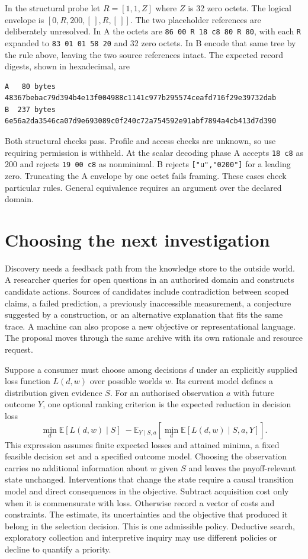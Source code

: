 \documentclass[11pt,a4paper]{article}
\newcommand{\partpage}[1]{\clearpage\section{#1}}
\newcommand{\topic}[1]{\par\smallskip{\sffamily\bfseries\color{ink}#1\par}\nobreak}
\begin{document}
\topic{Reference cases with known answers}
In the structural probe let $R=[1,1,Z]$ where $Z$ is 32 zero octets. The logical envelope is $[0,R,200,[\,],R,[\,]]$. The two placeholder references are deliberately unresolved. In A the octets are \texttt{86 00 R 18 c8 80 R 80}, with each \texttt{R} expanded to \texttt{83 01 01 58 20} and 32 zero octets. In B encode that same tree by the rule above, leaving the two source references intact. The expected record digests, shown in hexadecimal, are
\begin{small}
\begin{verbatim}
A   80 bytes   48367bebac79d394b4e13f004988c1141c977b295574ceafd716f29e39732dab
B  237 bytes   6e56a2da3546ca07d9e693089c0f240c72a754592e91abf7894a4cb413d7d390
\end{verbatim}
\end{small}
Both structural checks pass. Profile and access checks are unknown, so use requiring permission is withheld. At the scalar decoding phase A accepts \texttt{18 c8} as 200 and rejects \texttt{19 00 c8} as nonminimal. B rejects \texttt{["u","0200"]} for a leading zero. Truncating the A envelope by one octet fails framing. These cases check particular rules. General equivalence requires an argument over the declared domain.

\partpage{Choosing the next investigation}
Discovery needs a feedback path from the knowledge store to the outside world. A researcher queries for open questions in an authorised domain and constructs candidate actions. Sources of candidates include contradiction between scoped claims, a failed prediction, a previously inaccessible measurement, a conjecture suggested by a construction, or an alternative explanation that fits the same trace. A machine can also propose a new objective or representational language. The proposal moves through the same archive with its own rationale and resource request.

\topic{Planning under uncertainty}
Suppose a consumer must choose among decisions $d$ under an explicitly supplied loss function $L(d,w)$ over possible worlds $w$. Its current model defines a distribution given evidence $S$. For an authorised observation $a$ with future outcome $Y$, one optional ranking criterion is the expected reduction in decision loss
\[
\min_d \mathbb{E}[L(d,w)\mid S]\;-
\mathbb{E}_{Y\mid S,a}\!\left[\min_d \mathbb{E}[L(d,w)\mid S,a,Y]\right].
\]
This expression assumes finite expected losses and attained minima, a fixed feasible decision set and a specified outcome model. Choosing the observation carries no additional information about $w$ given $S$ and leaves the payoff-relevant state unchanged. Interventions that change the state require a causal transition model and direct consequences in the objective. Subtract acquisition cost only when it is commensurate with loss. Otherwise record a vector of costs and constraints. The estimate, its uncertainties and the objective that produced it belong in the selection decision. This is one admissible policy. Deductive search, exploratory collection and interpretive inquiry may use different policies or decline to quantify a priority.
\end{document}
